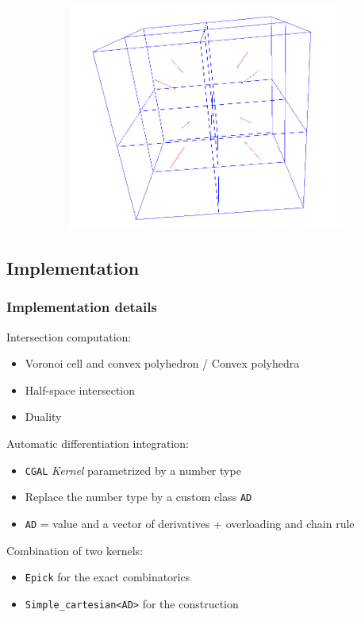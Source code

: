 \documentclass{beamer}
\begin{document}
\begin{frame}
\begin{figure}
\begin{subfigure}{.3\textwidth}
        \end{subfigure}
        \begin{subfigure}{.3\textwidth}
            \centering
            \includegraphics[scale=0.15]{img/cube-cube-15-ie}
        \end{subfigure}
    \end{figure}
\end{frame}

\subsection{Implementation}
\begin{frame}
    \frametitle{Implementation details}

    Intersection computation:
    \begin{itemize}
        \item Voronoi cell and convex polyhedron / Convex polyhedra
        \item Half-space intersection
        \item Duality
    \end{itemize}

    Automatic differentiation integration:
    \begin{itemize}
        \item \texttt{CGAL} \emph{Kernel} parametrized by a number type
        \item Replace the number type by a custom class \texttt{AD}
        \item \texttt{AD} = value and a vector of derivatives + overloading and
            chain rule
    \end{itemize}

    Combination of two kernels:
    \begin{itemize}
        \item \texttt{Epick} for the exact combinatorics
        \item \texttt{Simple\_cartesian<AD>} for the construction
    \end{itemize}
\end{frame}
\end{document}
